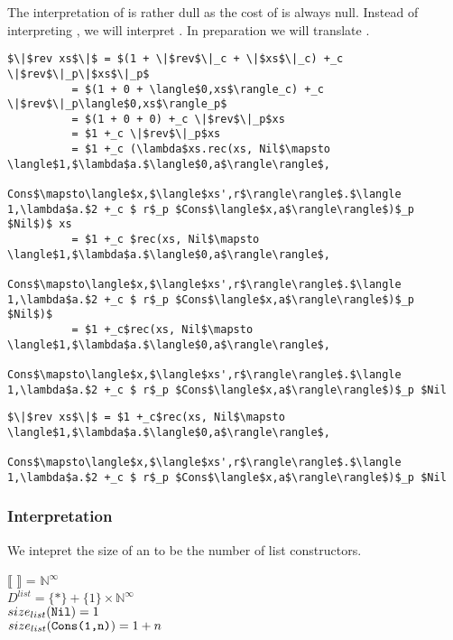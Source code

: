 The interpretation of  is rather dull as the cost of  is always null.
Instead of interpreting , we will interpret .
In preparation we will translate .
\begin{lstlisting}
$\|$rev xs$\|$ = $(1 + \|$rev$\|_c + \|$xs$\|_c) +_c \|$rev$\|_p\|$xs$\|_p$
          = $(1 + 0 + \langle$0,xs$\rangle_c) +_c \|$rev$\|_p\langle$0,xs$\rangle_p$
          = $(1 + 0 + 0) +_c \|$rev$\|_p$xs
          = $1 +_c \|$rev$\|_p$xs
          = $1 +_c (\lambda$xs.rec(xs, Nil$\mapsto \langle$1,$\lambda$a.$\langle$0,a$\rangle\rangle$,
                      Cons$\mapsto\langle$x,$\langle$xs',r$\rangle\rangle$.$\langle 1,\lambda$a.$2 +_c $ r$_p $Cons$\langle$x,a$\rangle\rangle$)$_p $Nil$)$ xs
          = $1 +_c $rec(xs, Nil$\mapsto \langle$1,$\lambda$a.$\langle$0,a$\rangle\rangle$,
                      Cons$\mapsto\langle$x,$\langle$xs',r$\rangle\rangle$.$\langle 1,\lambda$a.$2 +_c $ r$_p $Cons$\langle$x,a$\rangle\rangle$)$_p $Nil$)$
          = $1 +_c$rec(xs, Nil$\mapsto \langle$1,$\lambda$a.$\langle$0,a$\rangle\rangle$,
                  Cons$\mapsto\langle$x,$\langle$xs',r$\rangle\rangle$.$\langle 1,\lambda$a.$2 +_c $ r$_p $Cons$\langle$x,a$\rangle\rangle$)$_p $Nil
\end{lstlisting}
\begin{framed}
\begin{small}
\begin{lstlisting}
$\|$rev xs$\|$ = $1 +_c$rec(xs, Nil$\mapsto \langle$1,$\lambda$a.$\langle$0,a$\rangle\rangle$,
                  Cons$\mapsto\langle$x,$\langle$xs',r$\rangle\rangle$.$\langle 1,\lambda$a.$2 +_c $ r$_p $Cons$\langle$x,a$\rangle\rangle$)$_p $Nil
\end{lstlisting}
\end{small}
\end{framed}

\subsubsection*{Interpretation}

We intepret the size of an  to be the number of list constructors.
\begin{framed}
$\llbracket$  $\rrbracket$ = $\mathbb{N}^\infty$\\
$D^{list} = \{\ast\} + \{1\} \times \mathbb{N}^\infty$\\
$size_{list}(\texttt{Nil}) = 1$\\
$size_{list}(\texttt{Cons(1,n)}) = 1 + n$\\
\end{framed}

